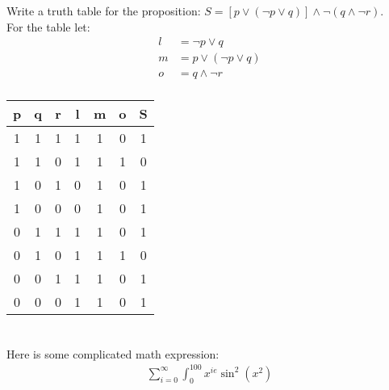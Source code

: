 \documentclass[12pt, letterpaper]{article}
\begin{document}
\section{}
Write a truth table for the proposition:
$S = [p\lor(\neg p\lor q)]\land \neg (q\land \neg r)$.\\
For the table let:
\begin{align*}
l &= \neg p \lor q\\
m &= p \lor (\neg p \lor q)\\
o &= q \land \neg r\\ 
\end{align*}
\begin{table} [!ht]
\centering
\begin{tabular} {c c c | c | c | c | c}
p & q & r & l & m & o & S\\ \hline
1 & 1 & 1 & 1 & 1 & 0 & 1\\
1 & 1 & 0 & 1 & 1 & 1 & 0\\
1 & 0 & 1 & 0 & 1 & 0 & 1\\
1 & 0 & 0 & 0 & 1 & 0 & 1\\
0 & 1 & 1 & 1 & 1 & 0 & 1\\
0 & 1 & 0 & 1 & 1 & 1 & 0\\
0 & 0 & 1 & 1 & 1 & 0 & 1\\
0 & 0 & 0 & 1 & 1 & 0 & 1\\
\end{tabular}
\end{table}

\section{}
Here is some complicated math expression:
\begin{align*}
	\sum_{i=0}^{\infty}\int_0^{100} x^{ie} \sin^2(x^2)
\end{align*}

\section{}
\end{document}
